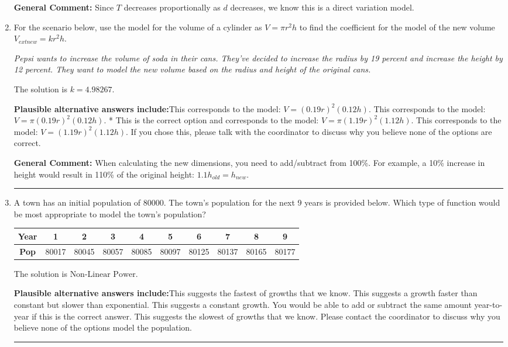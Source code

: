 \documentclass{extbook}[14pt]
\newcommand{\litem}[1]{\item #1

\rule{\textwidth}{0.4pt}}
\begin{document}
\begin{enumerate}
{\textbf{General Comment:} Since $T$ decreases proportionally as $d$ decreases, we know this is a direct variation model.
}
\litem{
For the scenario below, use the model for the volume of a cylinder as $V = \pi r^2 h$ to find the coefficient for the model of the new volume $V_{	ext{new}} = k r^2 h$.

\begin{center}
    \textit{ Pepsi wants to increase the volume of soda in their cans. They've decided to increase the radius by 19 percent and increase the height by 12 percent. They want to model the new volume based on the radius and height of the original cans. }
\end{center}
The solution is \( k = 4.98267 \).\begin{enumerate}[label=\Alph*.]
\textbf{Plausible alternative answers include:}This corresponds to the model: $V = (0.19 r)^2 (0.12 h)$.
This corresponds to the model: $V = \pi (0.19 r)^2 (0.12 h)$.
* This is the correct option and corresponds to the model: $V = \pi (1.19 r)^2 (1.12 h)$.
This corresponds to the model: $V = (1.19 r)^2 (1.12 h)$.
If you chose this, please talk with the coordinator to discuss why you believe none of the options are correct.
\end{enumerate}

\textbf{General Comment:} When calculating the new dimensions, you need to add/subtract from 100\%. For example, a 10\% increase in height would result in 110\% of the original height: $1.1h_{old} = h_{new}$.
}
\litem{
A town has an initial population of 80000. The town's population for the next 9 years is provided below. Which type of function would be most appropriate to model the town's population?


\begin{tabular}{c|c|c|c|c|c|c|c|c|c}
\textbf{Year} &1 &2 &3 &4 &5 &6 &7 &8 &9\tabularnewline \hline
\textbf{Pop} &80017 &80045 &80057 &80085 &80097 &80125 &80137 &80165 &80177\end{tabular}The solution is \( \text{Non-Linear Power} \).\begin{enumerate}[label=\Alph*.]
\textbf{Plausible alternative answers include:}This suggests the fastest of growths that we know.
This suggests a growth faster than constant but slower than exponential.
This suggests a constant growth. You would be able to add or subtract the same amount year-to-year if this is the correct answer.
This suggests the slowest of growths that we know.
Please contact the coordinator to discuss why you believe none of the options model the population.
\end{enumerate}

}
\end{enumerate}
\end{document}

